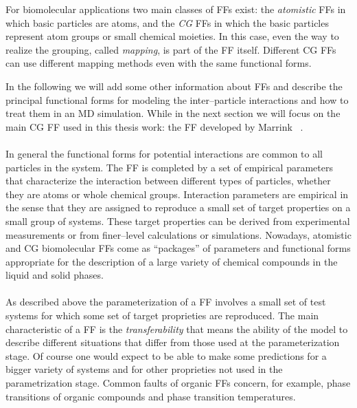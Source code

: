 For biomolecular applications two main classes of \acp{FF} exist: the \textit{atomistic} \acp{FF} in which basic 
particles are atoms, and the \textit{\ac{CG}} \acp{FF} in which the basic particles represent atom groups or 
small chemical moieties. In this case, even the way to realize the grouping, called \textit{mapping}, is part of 
the \ac{FF} itself. Different \ac{CG} \acp{FF} can use different mapping methods even with the same functional forms. 

In the following we will add some other information about \acp{FF} and describe the principal functional forms 
for modeling the inter--particle interactions and how to treat them in an \ac{MD} simulation. While in the next 
section we will focus on the main \ac{CG} \ac{FF} used in this thesis work: the  \ac{FF} 
developed by Marrink \etal\, \cite{Martini}.

\paragraph{\textbf{}} In general the functional forms for potential interactions are 
common to all particles in the system. The \ac{FF} is completed by a set of empirical parameters that 
characterize the interaction between different types of particles, whether they are atoms or whole chemical 
groups. Interaction parameters are empirical in the sense that they are assigned to reproduce a small set of 
target properties on a small group of systems. These target properties can be derived from experimental 
measurements or from finer--level calculations or simulations. Nowadays, atomistic and \ac{CG} biomolecular 
\acp{FF} come as ``packages'' of parameters and functional forms appropriate for the description of a large 
variety of chemical compounds in the liquid and solid phases.

\paragraph{\textbf{}} As described above the parameterization of a \ac{FF} involves a 
small set of test systems for which some set of target proprieties are reproduced. The main characteristic of a 
\ac{FF} is the \textit{transferability} that means the ability of the model to describe different situations that 
differ from those used at the parameterization stage. Of course one would expect to be able to make some 
predictions for a bigger variety of systems and for other proprieties not used in the parametrization stage. 
Common faults of organic \acp{FF} concern, for example, phase transitions of organic compounds and phase 
transition temperatures.

